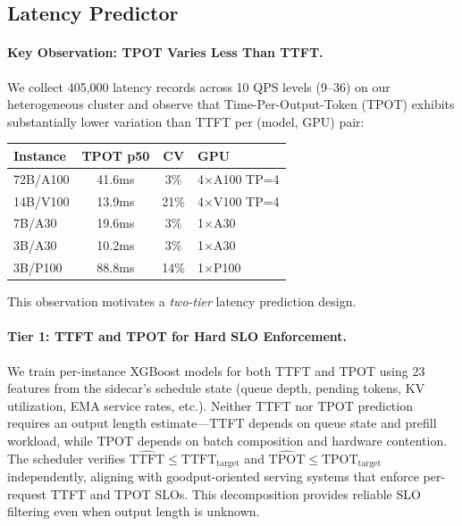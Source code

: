 \documentclass[letterpaper, anonymous, twocolumn, 10pt]{article}
\begin{document}
\subsection{Latency Predictor} \label{section:latency_predictor}

\paragraph{Key Observation: TPOT Varies Less Than TTFT.}
We collect 405,000 latency records across 10 QPS levels (9--36) on our heterogeneous cluster and observe that Time-Per-Output-Token (TPOT) exhibits substantially lower variation than TTFT per (model, GPU) pair:

\begin{center}
\small
\begin{tabular}{lccl}
\hline
Instance & TPOT p50 & CV & GPU \\
\hline
72B/A100 & 41.6ms & 3\% & 4$\times$A100 TP=4 \\
14B/V100 & 13.9ms & 21\% & 4$\times$V100 TP=4 \\
7B/A30 & 19.6ms & 3\% & 1$\times$A30 \\
3B/A30 & 10.2ms & 3\% & 1$\times$A30 \\
3B/P100 & 88.8ms & 14\% & 1$\times$P100 \\
\hline
\end{tabular}
\end{center}

This observation motivates a \emph{two-tier} latency prediction design.

\paragraph{Tier 1: TTFT and TPOT for Hard SLO Enforcement.}
We train per-instance XGBoost models for both TTFT and TPOT using 23 features from the sidecar's schedule state (queue depth, pending tokens, KV utilization, EMA service rates, etc.).
Neither TTFT nor TPOT prediction requires an output length estimate---TTFT depends on queue state and prefill workload, while TPOT depends on batch composition and hardware contention.
The scheduler verifies $\hat{\text{TTFT}} \leq \text{TTFT}_{\text{target}}$ and $\hat{\text{TPOT}} \leq \text{TPOT}_{\text{target}}$ independently, aligning with goodput-oriented serving systems that enforce per-request TTFT and TPOT SLOs.
This decomposition provides reliable SLO filtering even when output length is unknown.
\end{document}
